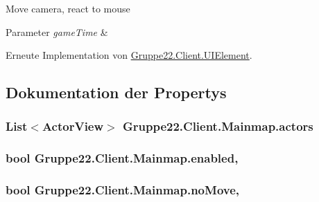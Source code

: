 Move camera, react to mouse 


\begin{DoxyParams}{Parameter}
{\em game\-Time} & \\
\hline
\end{DoxyParams}


Erneute Implementation von \hyperlink{class_gruppe22_1_1_client_1_1_u_i_element_a456bc763b6ed6ab441bb0ae96b6f4f8b}{Gruppe22.\-Client.\-U\-I\-Element}.



\subsection{Dokumentation der Propertys}
\hypertarget{class_gruppe22_1_1_client_1_1_mainmap_a3052907545bdede0789a79cc25b15883}{
\subsubsection[{actors}]{\setlength{\rightskip}{0pt plus 5cm}List$<${\bf Actor\-View}$>$ Gruppe22.\-Client.\-Mainmap.\-actors\hspace{0.3cm}{\ttfamily [get]}}}\label{class_gruppe22_1_1_client_1_1_mainmap_a3052907545bdede0789a79cc25b15883}
\hypertarget{class_gruppe22_1_1_client_1_1_mainmap_a05d1ac6585e8e336a812443bfead1617}{
\subsubsection[{enabled}]{\setlength{\rightskip}{0pt plus 5cm}bool Gruppe22.\-Client.\-Mainmap.\-enabled\hspace{0.3cm}{\ttfamily [get]}, {\ttfamily [set]}}}\label{class_gruppe22_1_1_client_1_1_mainmap_a05d1ac6585e8e336a812443bfead1617}
\hypertarget{class_gruppe22_1_1_client_1_1_mainmap_ad868efaa137848bf9692b8b51b763a6c}{
\subsubsection[{no\-Move}]{\setlength{\rightskip}{0pt plus 5cm}bool Gruppe22.\-Client.\-Mainmap.\-no\-Move\hspace{0.3cm}{\ttfamily [get]}, {\ttfamily [set]}}}\label{class_gruppe22_1_1_client_1_1_mainmap_ad868efaa137848bf9692b8b51b763a6c}
